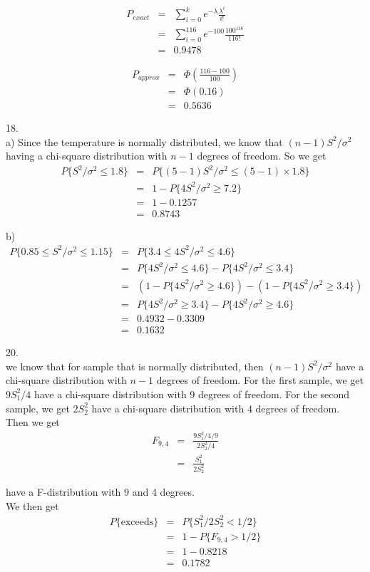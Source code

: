 \documentclass[12pt]{article}
\begin{document}
\begin{eqnarray*}
  P_{exact}
  &=& \sum_{i=0}^{k} e^{-\lambda} \frac{\lambda^i}{i!} \\
  &=& \sum_{i=0}^{116} e^{-100} \frac{100^{116}}{116!} \\
  &=& 0.9478
\end{eqnarray*}

\begin{eqnarray*}
  P_{approx}
  &=& \Phi (\frac {116 - 100}{100}) \\
  &=& \Phi (0.16) \\
  &=& 0.5636
\end{eqnarray*}

18. \\
a) Since the temperature is normally distributed, we know that $(n-1) S^2 / \sigma^2$ having a chi-square distribution with $n-1$ degrees of freedom. So we get
\begin{eqnarray*}
  P \{ S^2 / \sigma^2 \le 1.8 \}
  &=& P \{ (5-1) S^2 / \sigma^2 \le (5-1) \times 1.8 \} \\
  &=& 1 - P \{ 4 S^2 / \sigma^2 \ge 7.2 \} \\
  &=& 1 - 0.1257 \\
  &=& 0.8743
\end{eqnarray*}

b) 
\begin{eqnarray*}
  P \{ 0.85 \le S^2 / \sigma^2 \le 1.15 \}
  &=& P \{ 3.4 \le 4 S^2 / \sigma^2 \le 4.6 \} \\
  &=& P \{ 4 S^2 / \sigma^2 \le 4.6 \} - P \{ 4 S^2 / \sigma^2 \le 3.4 \} \\
  &=& (1 - P \{ 4 S^2 / \sigma^2 \ge 4.6 \})
  - (1 - P \{ 4 S^2 / \sigma^2 \ge 3.4 \}) \\
  &=& P \{ 4 S^2 / \sigma^2 \ge 3.4 \} - P \{ 4 S^2 / \sigma^2 \ge 4.6 \} \\
  &=& 0.4932 - 0.3309 \\
  &=& 0.1632
\end{eqnarray*}

20. \\
we know that for sample that is normally distributed, then $(n-1) S^2 / \sigma^2$ have a chi-square distribution with $n-1$ degrees of freedom. For the first sample, we get $9 S_1^2 / 4$ have a chi-square distribution with $9$ degrees of freedom. For the second sample, we get $2 S_2^2$ have a chi-square distribution with $4$ degrees of freedom. Then we get
\begin{eqnarray*}
  F_{9,4}
  &=& \frac {9 S_1^2 / 4 / 9}{2 S_2^2 / 4} \\
  &=& \frac {S_1^2}{2 S_2^2}
\end{eqnarray*}

have a F-distribution with 9 and 4 degrees. \\

We then get
\begin{eqnarray*}
  P \{ \text{exceeds} \}
  &=& P \{ S_1^2 / 2 S_2^2 < 1/2 \} \\
  &=& 1 - P \{ F_{9,4} > 1/2 \} \\
  &=& 1 - 0.8218 \\
  &=& 0.1782
\end{eqnarray*}
\end{document}
